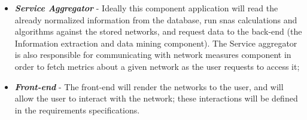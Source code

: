 \begin{itemize}
    \item \textbf{\textit{Service Aggregator}} - Ideally this component application will read the already normalized information from the database, run \glspl{sna} calculations and algorithms against the stored networks, and request data to the back-end (the Information extraction and data mining component). The Service aggregator is also responsible for communicating with network measures component in order to fetch metrics about a given network as the user requests to access it;
    \item \textbf{\textit{Front-end}} - The front-end will render the networks to the user, and will allow the user to interact with the network; these interactions will be defined in the requirements specifications.
\end{itemize}
